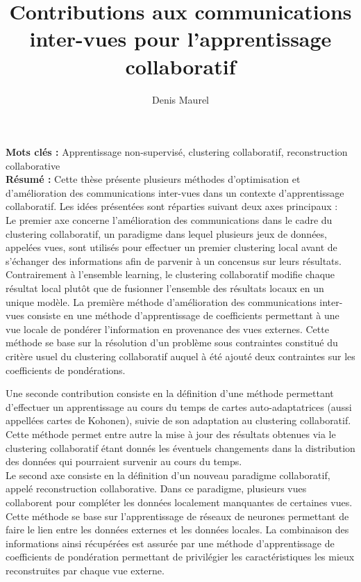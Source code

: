\documentclass[a4paper]{article}
\begin{document}
\title{Contributions aux communications inter-vues pour l'apprentissage collaboratif}
\author{Denis Maurel}
\maketitle

\textbf{Mots clés :} \quad Apprentissage non-supervisé, clustering collaboratif, reconstruction collaborative\\%


\textbf{Résumé :} \quad Cette thèse présente plusieurs méthodes d'optimisation et d'amélioration des communications inter-vues dans un contexte d'apprentissage collaboratif. Les idées présentées sont réparties suivant deux axes principaux :\\%

Le premier axe concerne l'amélioration des communications dans le cadre du clustering collaboratif, un paradigme dans lequel plusieurs jeux de données, appelées vues, sont utilisés pour effectuer un premier clustering local avant de s'échanger des informations afin de parvenir à un concensus sur leurs résultats. Contrairement à l'ensemble learning, le clustering collaboratif modifie chaque résultat local plutôt que de fusionner l'ensemble des résultats locaux en un unique modèle. La première méthode d'amélioration des communications inter-vues consiste en une méthode d'apprentissage de coefficients permettant à une vue locale de pondérer l'information en provenance des vues externes. Cette méthode se base sur la résolution d'un problème sous contraintes constitué du critère usuel du clustering collaboratif auquel à été ajouté deux contraintes sur les coefficients de pondérations.

Une seconde contribution consiste en la définition d'une méthode permettant d'effectuer un apprentissage au cours du temps de cartes auto-adaptatrices (aussi appellées cartes de Kohonen), suivie de son adaptation au clustering collaboratif. Cette méthode permet entre autre la mise à jour des résultats obtenues via le clustering collaboratif étant donnés les éventuels changements dans la distribution des données qui pourraient survenir au cours du temps.\\

Le second axe consiste en la définition d'un nouveau paradigme collaboratif, appelé reconstruction collaborative. Dans ce paradigme, plusieurs vues collaborent pour compléter les données localement manquantes de certaines vues. Cette méthode se base sur l'apprentissage de réseaux de neurones permettant de faire le lien entre les données externes et les données locales. La combinaison des informations ainsi récupérées est assurée par une méthode d'apprentissage de coefficients de pondération permettant de privilégier les caractéristiques les mieux reconstruites par chaque vue externe.
\end{document}
